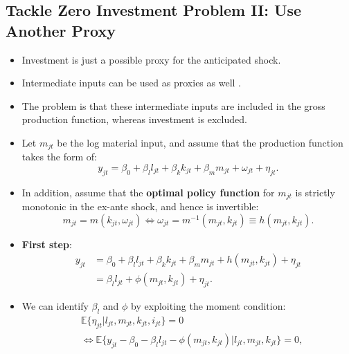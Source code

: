 \documentclass[
]{book}
\begin{document}
\hypertarget{tackle-zero-investment-problem-ii-use-another-proxy}{%
\subsection{Tackle Zero Investment Problem II: Use Another Proxy}\label{tackle-zero-investment-problem-ii-use-another-proxy}}

\begin{itemize}
\item
  Investment is just a possible proxy for the anticipated shock.
\item
  Intermediate inputs can be used as proxies as well \citep{Levinsohn2003}.
\item
  The problem is that these intermediate inputs are included in the gross production function, whereas investment is excluded.
\item
  Let \(m_{jt}\) be the log material input, and assume that the production function takes the form of:
  \begin{equation}
  y_{jt} = \beta_0 + \beta_l l_{jt} + \beta_k k_{jt} + \beta_m m_{jt} + \omega_{jt} + \eta_{jt}.
  \end{equation}
\item
  In addition, assume that the \textbf{optimal policy function} for \(m_{jt}\) is strictly monotonic in the ex-ante shock, and hence is invertible:
  \begin{equation}
  m_{jt} = m(k_{jt}, \omega_{jt}) \Leftrightarrow \omega_{jt} = m^{-1}(m_{jt}, k_{jt}) \equiv h(m_{jt}, k_{jt}). \label{eq:material}
  \end{equation}
\item
  \textbf{First step}:
  \begin{equation}
  \begin{split}
  y_{jt} &= \beta_0 + \beta_l l_{jt} + \beta_k k_{jt} + \beta_m m_{jt} + h(m_{jt}, k_{jt}) + \eta_{jt}\\
  &= \beta_l l_{jt} + \phi(m_{jt}, k_{jt}) + \eta_{jt}.
  \end{split}
  \end{equation}
\item
  We can identify \(\beta_l\) and \(\phi\) by exploiting the moment condition:
  \begin{equation}
  \begin{split}
  & \mathbb{E}\{\eta_{jt}|l_{jt}, m_{jt}, k_{jt}, i_{jt}\} = 0\\
  & \Leftrightarrow \mathbb{E}\{y_{jt} - \beta_0 - \beta_l l_{jt} - \phi(m_{jt}, k_{jt}) |l_{jt}, m_{jt}, k_{jt}\} = 0,

\end{split}
\end{equation}
\end{itemize}
\end{document}
